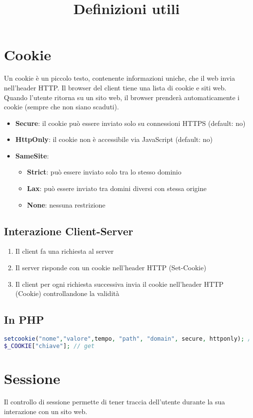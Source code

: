 \documentclass[12pt, a4paper]{article}
\title{Definizioni utili}
\date{}
\author{}
\begin{document}
\maketitle 
\section{Cookie}
Un cookie è un piccolo testo, contenente informazioni uniche, che il web invia nell'header HTTP. Il browser del client tiene una lista di cookie e siti web. Quando l'utente ritorna su un sito web, il browser prenderà automaticamente i cookie (sempre che non siano scaduti).
\begin{itemize}
    \item \textbf{Secure}: il cookie può essere inviato solo su connessioni HTTPS (default: no)
    \item \textbf{HttpOnly}: il cookie non è accessibile via JavaScript (default: no)
    \item \textbf{SameSite}: \begin{itemize}
        \item \textbf{Strict}: può essere inviato solo tra lo stesso dominio
        \item \textbf{Lax}: può essere inviato tra domini diversi con stessa origine
        \item \textbf{None}: nessuna restrizione
    \end{itemize}
\end{itemize}
\subsection{Interazione Client-Server}
\begin{enumerate}
    \item Il client fa una richiesta al server
    \item Il server risponde con un cookie nell'header HTTP (Set-Cookie)
    \item Il client per ogni richiesta successiva invia il cookie nell'header HTTP (Cookie) controllandone la validità
\end{enumerate}
\subsection{In PHP}
\begin{lstlisting}[language=PHP]
setcookie("nome","valore",tempo, "path", "domain", secure, httponly); // set
$_COOKIE["chiave"]; // get
\end{lstlisting}
\section{Sessione}
Il controllo di sessione permette di tener traccia dell'utente durante la sua interazione con un sito web.
\end{document}
